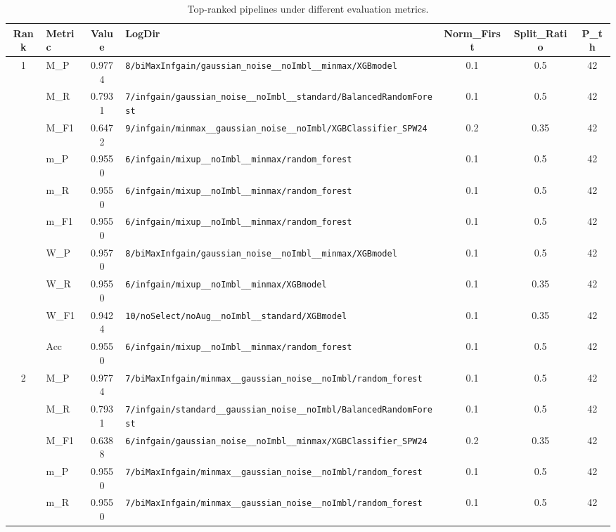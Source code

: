 \begin{table}[htbp]
\caption{Top-ranked pipelines under different evaluation metrics.}
\label{tab:rank_metric_vertical}
\centering
\small
\setlength{\tabcolsep}{4pt}
\begin{tabular}{|c|l|c|>{\ttfamily\footnotesize}p{7.2cm}|c|c|c|}
\hline
Rank & Metric & Value & LogDir & Norm\_First & Split\_Ratio & P\_th \\
\hline
\multirow{10}{*}{1} & M\_P & 0.9774 & \texttt{8/biMaxInfgain/gaussian\_noise\_\_noImbl\_\_minmax/XGBmodel} & 0.1 & 0.5  & 42 \\ 
 & M\_R & 0.7931 & \texttt{7/infgain/gaussian\_noise\_\_noImbl\_\_standard/BalancedRandomForest} & 0.1 & 0.5  & 42 \\ 
 & M\_F1 & 0.6472 & \texttt{9/infgain/minmax\_\_gaussian\_noise\_\_noImbl/XGBClassifier\_SPW24} & 0.2 & 0.35  & 42 \\ 
 & m\_P & 0.9550 & \texttt{6/infgain/mixup\_\_noImbl\_\_minmax/random\_forest} & 0.1 & 0.5  & 42 \\ 
 & m\_R & 0.9550 & \texttt{6/infgain/mixup\_\_noImbl\_\_minmax/random\_forest} & 0.1 & 0.5  & 42 \\ 
 & m\_F1 & 0.9550 & \texttt{6/infgain/mixup\_\_noImbl\_\_minmax/random\_forest} & 0.1 & 0.5  & 42 \\ 
 & W\_P & 0.9570 & \texttt{8/biMaxInfgain/gaussian\_noise\_\_noImbl\_\_minmax/XGBmodel} & 0.1 & 0.5  & 42 \\ 
 & W\_R & 0.9550 & \texttt{6/infgain/mixup\_\_noImbl\_\_minmax/XGBmodel} & 0.1 & 0.35  & 42 \\ 
 & W\_F1 & 0.9424 & \texttt{10/noSelect/noAug\_\_noImbl\_\_standard/XGBmodel} & 0.1 & 0.35  & 42 \\ 
 & Acc & 0.9550 & \texttt{6/infgain/mixup\_\_noImbl\_\_minmax/random\_forest} & 0.1 & 0.5  & 42 \\ 
\hline
\multirow{10}{*}{2} & M\_P & 0.9774 & \texttt{7/biMaxInfgain/minmax\_\_gaussian\_noise\_\_noImbl/random\_forest} & 0.1 & 0.5  & 42 \\ 
 & M\_R & 0.7931 & \texttt{7/infgain/standard\_\_gaussian\_noise\_\_noImbl/BalancedRandomForest} & 0.1 & 0.5  & 42 \\ 
 & M\_F1 & 0.6388 & \texttt{6/infgain/gaussian\_noise\_\_noImbl\_\_minmax/XGBClassifier\_SPW24} & 0.2 & 0.35  & 42 \\ 
 & m\_P & 0.9550 & \texttt{7/biMaxInfgain/minmax\_\_gaussian\_noise\_\_noImbl/random\_forest} & 0.1 & 0.5  & 42 \\ 
 & m\_R & 0.9550 & \texttt{7/biMaxInfgain/minmax\_\_gaussian\_noise\_\_noImbl/random\_forest} & 0.1 & 0.5  & 42 \\ 

\end{tabular}
\end{table}
